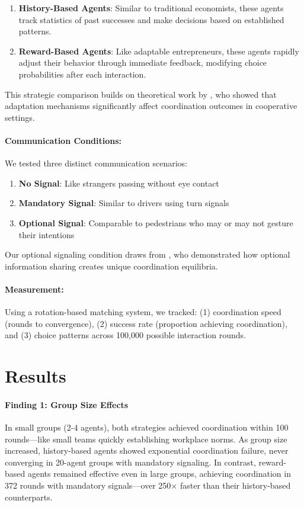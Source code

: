 \documentclass[12pt,a4paper]{article}
\begin{document}
\begin{enumerate}
    \item \textbf{History-Based Agents}: Similar to traditional economists, these agents track statistics of past successes and make decisions based on established patterns.
    
    \item \textbf{Reward-Based Agents}: Like adaptable entrepreneurs, these agents rapidly adjust their behavior through immediate feedback, modifying choice probabilities after each interaction.
\end{enumerate}

This strategic comparison builds on theoretical work by \citet{Claus1998}, who showed that adaptation mechanisms significantly affect coordination outcomes in cooperative settings.

\paragraph{Communication Conditions:} We tested three distinct communication scenarios:
\begin{enumerate}
    \item \textbf{No Signal}: Like strangers passing without eye contact
    \item \textbf{Mandatory Signal}: Similar to drivers using turn signals
    \item \textbf{Optional Signal}: Comparable to pedestrians who may or may not gesture their intentions
\end{enumerate}

Our optional signaling condition draws from \citet{Skyrms2010}, who demonstrated how optional information sharing creates unique coordination equilibria.

\paragraph{Measurement:} Using a rotation-based matching system, we tracked: (1) coordination speed (rounds to convergence), (2) success rate (proportion achieving coordination), and (3) choice patterns across 100,000 possible interaction rounds.

\section{Results}

\paragraph{Finding 1: Group Size Effects} In small groups (2-4 agents), both strategies achieved coordination within 100 rounds—like small teams quickly establishing workplace norms. As group size increased, history-based agents showed exponential coordination failure, never converging in 20-agent groups with mandatory signaling. In contrast, reward-based agents remained effective even in large groups, achieving coordination in 372 rounds with mandatory signals—over 250× faster than their history-based counterparts.
\end{document}
